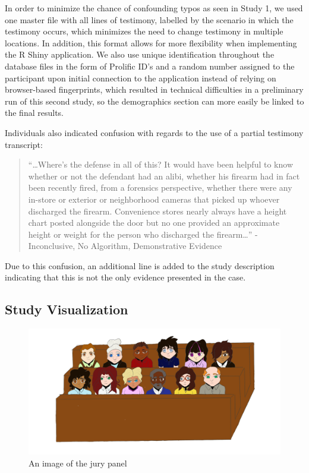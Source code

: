 \documentclass[print]{nuthesis}
\begin{document}
In order to minimize the chance of confounding typos as seen in Study 1, we used one master file with all lines of testimony, labelled by the scenario in which the testimony occurs, which minimizes the need to change testimony in multiple locations.
In addition, this format allows for more flexibility when implementing the R Shiny application.
We also use unique identification throughout the database files in the form of Prolific ID's and a random number assigned to the participant upon initial connection to the application instead of relying on browser-based fingerprints, which resulted in technical difficulties in a preliminary run of this second study, so the demographics section can more easily be linked to the final results.

Individuals also indicated confusion with regards to the use of a partial testimony transcript:

\begin{quote}
``\ldots Where's the defense in all of this? It would have been helpful to know whether or not the defendant had an alibi, whether his firearm had in fact been recently fired, from a forensics perspective, whether there were any in-store or exterior or neighborhood cameras that picked up whoever discharged the firearm. Convenience stores nearly always have a height chart posted alongside the door but no one provided an approximate height or weight for the person who discharged the firearm\ldots{}'' - Inconclusive, No Algorithm, Demonstrative Evidence
\end{quote}

Due to this confusion, an additional line is added to the study description indicating that this is not the only evidence presented in the case.

\hypertarget{study-visualization}{%
\subsection{Study Visualization}\label{study-visualization}}

\begin{figure}

{\centering \includegraphics[width=\linewidth]{images/Jury} 

}

\caption{An image of the jury panel}\label{fig:jurypanel}
\end{figure}
\end{document}
